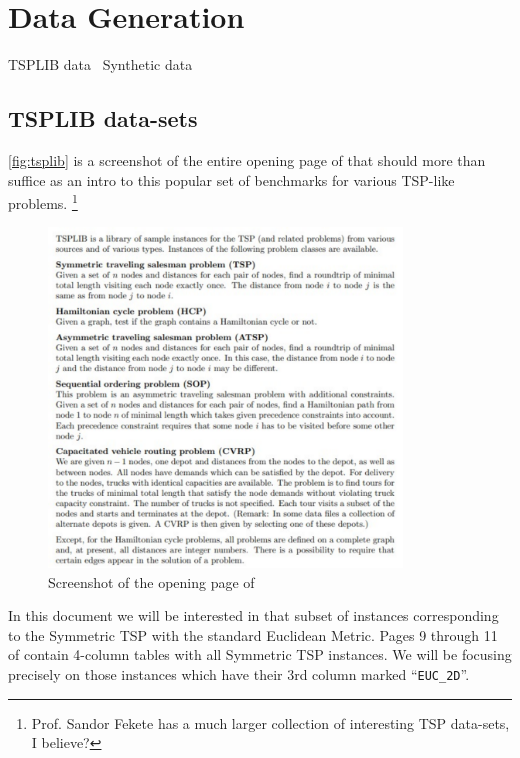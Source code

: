 \section{Data Generation}

\nwenddocs{}\endmoddef\nwstartdeflinemarkup{}\nwenddeflinemarkup
\LA{}TSPLIB data~{\nwtagstyle{}}\RA{}
\LA{}Synthetic data~{\nwtagstyle{}}\RA{}
\nwendcode{}\nwdocspar

\subsection{TSPLIB data-sets}

\autoref{fig:tsplib} is a screenshot of the entire opening page of \cite{reinelt1991tsplib}
that should more than suffice as an intro to this popular set of benchmarks for various TSP-like problems. \footnote{Prof. Sandor Fekete has a much larger collection of interesting TSP data-sets, I believe?}

\begin{figure}[htbp]
  \centering
  \includegraphics[width=9.4cm]{miscimages/tsplib-screenshot.pdf}
  \caption{\label{fig:tsplib} Screenshot of the opening page of \cite{reinelt1991tsplib} }
\end{figure}

In this document we will be interested in that subset of instances corresponding to the Symmetric TSP with the standard 
Euclidean Metric. Pages 9 through 11 of \cite{reinelt1991tsplib} contain 4-column tables with all Symmetric TSP instances. 
We will be focusing precisely on those instances which have their 3rd column marked ``\verb|EUC_2D|''.  

